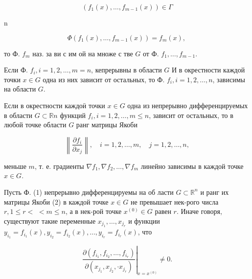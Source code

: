 \documentclass[10pt]{article}
\begin{document}
\[

\left(f_{1}(x), \ldots, f_{m-1}(x)\right) \in \Gamma

\]



n



\[

\Phi\left(f_{1}(x), \ldots, f_{m-1}(x)\right)=f_{m}(x) \text {, }

\]



то Ф. $f_{m}$ наз. за ви с им ой на множе с тве $G$ от Ф. $f_{1}, \ldots, f_{m-1}$.



Если Ф. $f_{i}, i=1,2, \ldots, m=n$, кепрерывны в области $G$ И в окрестности каждой точки $x \in G$ одна из них зависит от остальных, то Ф. $f_{i}, i=1,2, \ldots, n$, зависимы на области $G$.



Если в окрестности каждоӥ точки $x \in G$ одна из непрерывно дифференцируемых в области $G \subset \mathbb{R} n$ функций $f_{i}, i=1,2, \ldots, m \leqslant n$, зависит от остальных, то в любой точке области $G$ ранг матрицы Якоби



\[

\left\|\frac{\partial f_{i}}{\partial x_{j}}\right\|, \quad i=1,2, \ldots, m, \quad j=1,2, \ldots, n,

\]



меньше $m$, т. е. градиенты $\nabla f_{1}, \nabla f_{2}, \ldots, \nabla f_{m}$ линейно зависимы в каждой точке $x \in G$.



Пусть Ф. (1) непрерывно дифференцируемы на об ласти $G \subset \mathbb{R}^{n}$ и ранг их матрицы Якоби (2) в каждой точке $x \in G$ не превышает нек-рого числа $r, 1 \leqslant r<$ $<m \leqslant n$, а в нек-рой точке $x^{(0)} \in G$ равен $r$. Иначе говоря, существуют такие переменные $x_{j_{1}}, \ldots, x_{j_{r}}$ и функции $y_{i_{1}}=f_{i_{1}}(x), y_{i_{2}}=f_{i_{2}}(x), \ldots, y_{i_{r}}=f_{i_{r}}(x)$, что



\[

\left.\frac{\partial\left(f_{i_{1}}, f_{i_{2}}, \ldots, f_{i_{r}}\right)}{\partial\left(x_{j_{1}}, x_{j_{2}}, \cdot x_{j_{r}}\right)}\right|_{x=x^{(0)}} \neq 0 .

\]
\end{document}
